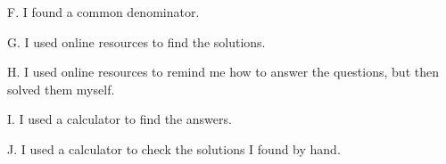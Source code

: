 \documentclass{ximera}
\begin{document}
\begin{question}
\begin{question}
      \begin{multipleChoice}
    \end{multipleChoice}
    
\end{question}
\begin{question}
    
    F. I found a common denominator.

    \begin{multipleChoice}
    \end{multipleChoice}
    
\end{question}
\begin{question}
    
    G. I used online resources to find the solutions.

    \begin{multipleChoice}
    \end{multipleChoice}
    
\end{question}
\begin{question}
    
    H. I used online resources to remind me how to answer the questions, but then solved them myself.

    \begin{multipleChoice}
    \end{multipleChoice}
    
\end{question}
\begin{question}
    
    I. I used a calculator to find the answers.

    \begin{multipleChoice}
    \end{multipleChoice}
    
\end{question}
\begin{question}
    
    J. I used a calculator to check the solutions I found by hand.

    \begin{multipleChoice}
    \end{multipleChoice}
    

\end{question}
\end{question}
\end{document}
